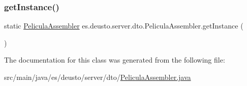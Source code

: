 \mbox{\label{classes_1_1deusto_1_1server_1_1dto_1_1_pelicula_assembler_a2be8d853cb1714eb6c35b4e2fd0ff565}} 
\subsubsection{\texorpdfstring{getInstance()}{getInstance()}}
{\footnotesize\ttfamily static \mbox{\hyperlink{classes_1_1deusto_1_1server_1_1dto_1_1_pelicula_assembler}{Pelicula\+Assembler}} es.\+deusto.\+server.\+dto.\+Pelicula\+Assembler.\+get\+Instance (\begin{DoxyParamCaption}{ }\end{DoxyParamCaption})\hspace{0.3cm}{\ttfamily [static]}}



The documentation for this class was generated from the following file\+:\begin{DoxyCompactItemize}
\item 
src/main/java/es/deusto/server/dto/\mbox{\hyperlink{_pelicula_assembler_8java}{Pelicula\+Assembler.\+java}}\end{DoxyCompactItemize}
